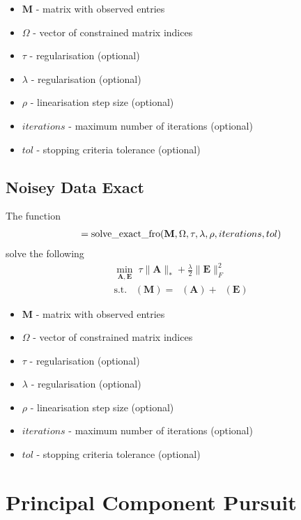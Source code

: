 \documentclass{article}
\DeclareMathOperator*{\pro}{\mathcal P_{\Omega}}
\begin{document}
\begin{itemize}
\item $\mathbf M$ - matrix with observed entries
\item $\Omega$ - vector of constrained matrix indices
\item $\tau$ - regularisation (optional)
\item $\lambda$ - regularisation (optional)
\item $\rho$ - linearisation step size (optional)
\item $iterations$ - maximum number of iterations (optional)
\item $tol$ - stopping criteria tolerance (optional)
\end{itemize}

\subsection{Noisey Data Exact}
\label{mc_exact_fro}

The function
\begin{align}
[ \mathbf A, \mathbf{f\_vals}, \mathbf{stop\_vals} ] = \text{solve\_exact\_fro}( \mathbf M, \Omega, \tau, \lambda, \rho, iterations, tol ) \notag
\end{align}
solve the following
\begin{align}
\min_{\mathbf A, \mathbf E} \; \tau \| \mathbf A \|_* + \frac{\lambda}{2} \| \mathbf E \|_F^2\\
\text{s.t.} \; \pro (\mathbf M) = \pro (\mathbf A) + \pro (\mathbf E) \nonumber 
\end{align}

\begin{itemize}
\item $\mathbf M$ - matrix with observed entries
\item $\Omega$ - vector of constrained matrix indices
\item $\tau$ - regularisation (optional)
\item $\lambda$ - regularisation (optional)
\item $\rho$ - linearisation step size (optional)
\item $iterations$ - maximum number of iterations (optional)
\item $tol$ - stopping criteria tolerance (optional)
\end{itemize}


\newpage
\section{Principal Component Pursuit}
\end{document}

